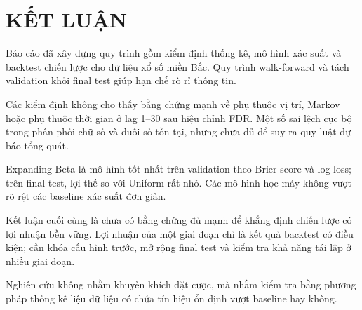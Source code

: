 \chapter{KẾT LUẬN}
Báo cáo đã xây dựng quy trình gồm kiểm định thống kê, mô hình xác suất và backtest chiến lược cho dữ liệu xổ số miền Bắc. Quy trình walk-forward và tách validation khỏi final test giúp hạn chế rò rỉ thông tin.

Các kiểm định không cho thấy bằng chứng mạnh về phụ thuộc vị trí, Markov hoặc phụ thuộc thời gian ở lag 1--30 sau hiệu chỉnh FDR. Một số sai lệch cục bộ trong phân phối chữ số và đuôi số tồn tại, nhưng chưa đủ để suy ra quy luật dự báo tổng quát.

Expanding Beta là mô hình tốt nhất trên validation theo Brier score và log loss; trên final test, lợi thế so với Uniform rất nhỏ. Các mô hình học máy không vượt rõ rệt các baseline xác suất đơn giản.

Kết luận cuối cùng là chưa có bằng chứng đủ mạnh để khẳng định chiến lược có lợi nhuận bền vững. Lợi nhuận của một giai đoạn chỉ là kết quả backtest có điều kiện; cần khóa cấu hình trước, mở rộng final test và kiểm tra khả năng tái lập ở nhiều giai đoạn.

Nghiên cứu không nhằm khuyến khích đặt cược, mà nhằm kiểm tra bằng phương pháp thống kê liệu dữ liệu có chứa tín hiệu ổn định vượt baseline hay không.